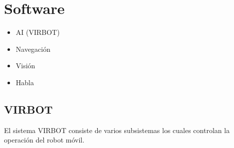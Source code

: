 \documentclass[user_manual.tex]{subfiles}
\begin{document}
 
 \chapter{Software}

\begin{itemize}
	\item{AI (VIRBOT)}

	\item{Navegación}
	
	\item{Visión}
	
	\item{Habla}
\end{itemize}

\section{VIRBOT}

El sistema VIRBOT consiste de varios subsistemas los cuales controlan la operación del robot móvil.
\end{document}
